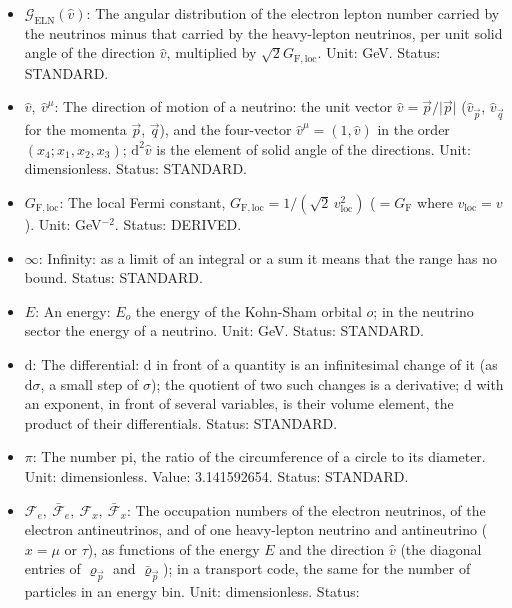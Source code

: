 \documentclass[
  10pt,
]{article}
\providecommand{\tightlist}{%
  \setlength{\itemsep}{0pt}\setlength{\parskip}{0pt}}
\begin{document}
\begin{itemize}
\tightlist
\item
  \(\mathcal{G}_{\mathrm{ELN}}(\hat v)\): The angular distribution of
  the electron lepton number carried by the neutrinos minus that carried
  by the heavy-lepton neutrinos, per unit solid angle of the direction
  \(\hat v\), multiplied by \(\sqrt2G_{\mathrm{F,loc}}\). Unit: GeV.
  Status: STANDARD.
\item
  \(\hat v,\ \hat v^\mu\): The direction of motion of a neutrino: the
  unit vector \(\hat v = \vec p/\lvert\vec p\rvert\)
  (\(\hat v_{\vec p}\), \(\hat v_{\vec q}\) for the momenta \(\vec p\),
  \(\vec q\)), and the four-vector \(\hat v^\mu = (1, \hat v)\) in the
  order \((x_4; x_1, x_2, x_3)\); \(\mathrm{d}^2\hat v\) is the element
  of solid angle of the directions. Unit: dimensionless. Status:
  STANDARD.
\item
  \(G_{\mathrm{F,loc}}\): The local Fermi constant,
  \(G_{\mathrm{F,loc}} = 1/(\sqrt2\,v_{\mathrm{loc}}^2)\)
  (\(= G_{\mathrm{F}}\) where \(v_{\mathrm{loc}} = v\)). Unit:
  GeV\(^{-2}\). Status: DERIVED.
\item
  \(\infty\): Infinity: as a limit of an integral or a sum it means that
  the range has no bound. Status: STANDARD.
\item
  \(E\): An energy: \(E_o\) the energy of the Kohn-Sham orbital \(o\);
  in the neutrino sector the energy of a neutrino. Unit: GeV. Status:
  STANDARD.
\item
  \(\mathrm{d}\): The differential: \(\mathrm{d}\) in front of a
  quantity is an infinitesimal change of it (as \(\mathrm{d}\sigma\), a
  small step of \(\sigma\)); the quotient of two such changes is a
  derivative; \(\mathrm{d}\) with an exponent, in front of several
  variables, is their volume element, the product of their
  differentials. Status: STANDARD.
\item
  \(\pi\): The number pi, the ratio of the circumference of a circle to
  its diameter. Unit: dimensionless. Value: 3.141592654. Status:
  STANDARD.
\item
  \(\mathcal{F}_{e},\ \bar{\mathcal{F}}_{e},\ \mathcal{F}_{x},\ \bar{\mathcal{F}}_{x}\):
  The occupation numbers of the electron neutrinos, of the electron
  antineutrinos, and of one heavy-lepton neutrino and antineutrino
  (\(x = \mu\) or \(\tau\)), as functions of the energy \(E\) and the
  direction \(\hat v\) (the diagonal entries of \(\varrho_{\vec p}\) and
  \(\bar\varrho_{\vec p}\)); in a transport code, the same for the
  number of particles in an energy bin. Unit: dimensionless. Status:

\end{itemize}
\end{document}
